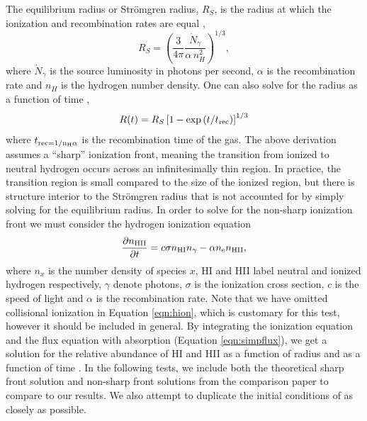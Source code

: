 \documentclass[fleq,usenatbib]{mnras}
\newcommand{\strom}{Str\"omgren}
\begin{document}
{The equilibrium radius or \strom{} radius, $R_S$, is the radius at which the 
ionization and recombination rates are equal \citep[e.g.][]{tielens05},
\begin{equation}
R_S = \left(\frac{3}{4\pi}\frac{\dot{N}_\gamma}{\alpha\, n^2_{H}}\right)^{1/3},
\end{equation}
where $\dot{N}_\gamma$ is the source luminosity in photons per second, 
$\alpha$ is the recombination rate and $n_H$ is the hydrogen number density. 
One can also solve for the radius as a function of time 
\citep[e.g.][]{spitzer78},
\begin{equation}\label{eqn:stromtime}
R(t) = R_S\left[1-\exp\left(t/t_{\rm rec}\right)\right]^{1/3}
\end{equation}
where $t_{\rm rec = 1/{n_H \alpha}}$ is the recombination time of the 
gas. The above derivation assumes a ``sharp'' ionization front, meaning the 
transition from ionized to neutral hydrogen occurs across an infinitesimally thin 
region. In practice, the transition region is small compared to the size of 
the ionized region, but there is structure interior to the \strom{} radius 
that is not accounted for by simply solving for the equilibrium radius. In 
order to solve for the non-sharp ionization front we must consider the 
hydrogen ionization equation
\begin{equation}\label{eqn:hion}
\frac{\partial n_{\rm HII}}{\partial t} = c \sigma n_{\rm HI} n_{\gamma} - 
\alpha n_{\rm e} n_{\rm HII},
\end{equation}
where $n_x$ is the number density of species $x$, HI and HII label neutral 
and ionized hydrogen respectively, $\gamma$ denote photons, $\sigma$ is the 
ionization cross section, $c$ is the speed of light and $\alpha$ is the 
recombination rate. Note that we have omitted collisional ionization in 
Equation \ref{eqn:hion}, which is customary for this test, however it 
should be included in general. By integrating the ionization equation and the 
flux equation with absorption (Equation \ref{eqn:simpflux}), we get a solution 
for the relative abundance of HI and HII as a function of radius and as a 
function of time \citep{osterbrockFerland2006}. In the following tests, we 
include both the theoretical sharp front solution and non-sharp front 
solutions from the \cite{ilievEt06} comparison paper to compare to our 
results. We also attempt to duplicate the initial conditions of 
\cite{ilievEt06} as closely as possible.

}
\end{document}

